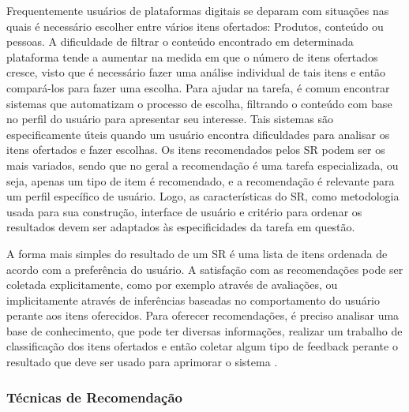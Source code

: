 \documentclass[12pt]{article}
\begin{document}
Frequentemente usuários de plataformas digitais se deparam com situações nas quais é necessário escolher entre 
vários itens ofertados: Produtos, conteúdo ou pessoas. A dificuldade de filtrar o conteúdo encontrado em determinada 
plataforma tende a aumentar na medida em que o número de itens ofertados cresce, visto que é necessário fazer uma 
análise individual de tais itens e então compará-los para fazer uma escolha. Para ajudar na tarefa, é comum encontrar 
sistemas que automatizam o processo de escolha, filtrando o conteúdo com base no perfil do usuário para apresentar 
seu interesse. Tais sistemas são especificamente úteis quando um usuário encontra dificuldades para analisar os itens 
ofertados e fazer escolhas. Os itens recomendados pelos SR podem ser os mais variados, sendo que no geral a recomendação 
é uma tarefa especializada, ou seja, apenas um tipo de item é recomendado, e a recomendação é relevante para um perfil 
específico de usuário. Logo, as características do SR, como metodologia usada para sua construção, interface de usuário 
e critério para ordenar os resultados devem ser adaptados às especificidades da tarefa em questão. 

A forma mais simples do resultado de um SR é uma lista de itens ordenada de acordo com a preferência do usuário. A satisfação 
com as recomendações pode ser coletada explicitamente, como por exemplo através de avaliações, ou implicitamente através de 
inferências baseadas no comportamento do usuário perante aos itens oferecidos. Para oferecer recomendações, é preciso analisar 
uma base de conhecimento, que pode ter diversas informações, realizar um trabalho de classificação dos itens ofertados e 
então coletar algum tipo de feedback perante o resultado que deve ser usado para aprimorar o sistema \cite{ricci2011introduction}.

\subsubsection{Técnicas de Recomendação}
\end{document}
